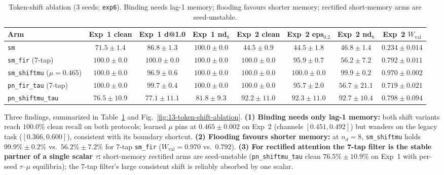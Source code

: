 \documentclass[11pt,a4paper]{article}
\begin{document}
\begin{table}[ht!]
\centering
\caption{Token-shift ablation (3 seeds; \texttt{exp6}). Binding needs lag-1 memory; flooding favours shorter memory; rectified short-memory arms are seed-unstable.}
\label{tab:exp6}
\scriptsize
\setlength{\tabcolsep}{3.0pt}
\begin{tabular}{lccccccc}
\toprule
Arm & Exp~1 clean & Exp~1 d@1.0 & Exp~1 nd$_8$ & Exp~2 clean & Exp~2 eps$_{0.2}$ & Exp~2 nd$_8$ & Exp~2 $W_{\text{val}}$ \\
\midrule
\texttt{sm} & $71.5 \pm 1.4$ & $86.8 \pm 1.3$ & $100.0 \pm 0.0$ & $44.5 \pm 0.9$ & $44.5 \pm 1.8$ & $46.8 \pm 1.4$ & $0.234 \pm 0.014$ \\
\texttt{sm\_fir} (7-tap) & $\mathbf{100.0 \pm 0.0}$ & $\mathbf{100.0 \pm 0.0}$ & $\mathbf{100.0 \pm 0.0}$ & $\mathbf{100.0 \pm 0.0}$ & $95.9 \pm 0.7$ & $56.2 \pm 7.2$ & $0.792 \pm 0.011$ \\
\texttt{sm\_shiftmu} ($\mu{=}0.465$) & $\mathbf{100.0 \pm 0.0}$ & $96.9 \pm 0.6$ & $\mathbf{100.0 \pm 0.0}$ & $\mathbf{100.0 \pm 0.0}$ & $\mathbf{100.0 \pm 0.0}$ & $\mathbf{99.9 \pm 0.2}$ & $\mathbf{0.970 \pm 0.002}$ \\
\texttt{pn\_fir\_tau} (7-tap) & $\mathbf{100.0 \pm 0.0}$ & $99.7 \pm 0.4$ & $\mathbf{100.0 \pm 0.0}$ & $\mathbf{100.0 \pm 0.0}$ & $95.7 \pm 2.0$ & $56.7 \pm 21.1$ & $0.719 \pm 0.021$ \\
\texttt{pn\_shiftmu\_tau} & $76.5 \pm 10.9$ & $77.1 \pm 11.1$ & $81.8 \pm 9.3$ & $92.2 \pm 11.0$ & $92.3 \pm 11.0$ & $92.7 \pm 10.4$ & $0.798 \pm 0.094$ \\
\bottomrule
\end{tabular}
\end{table}

Three findings, summarized in Table~\ref{tab:exp6} and Fig.~\ref{fig:13-token-shift-ablation}. \textbf{(1) Binding needs only lag-1 memory:} both shift variants reach $100.0\%$ clean recall on both protocols; learned $\mu$ pins at $0.465 \pm 0.002$ on Exp~2 (channels $[0.451, 0.492]$) but wanders on the legacy task ($[0.366, 0.600]$), consistent with its boundary shortcut. \textbf{(2) Flooding favours shorter memory:} at $n_d{=}8$, \texttt{sm\_shiftmu} holds $99.9\% \pm 0.2\%$ vs.\ $56.2\% \pm 7.2\%$ for 7-tap \texttt{sm\_fir} ($W_{\text{val}} = 0.970$ vs.\ $0.792$). \textbf{(3) For rectified attention the 7-tap filter is the stable partner of a single scalar $\tau$:} short-memory rectified arms are seed-unstable (\texttt{pn\_shiftmu\_tau} clean $76.5\% \pm 10.9\%$ on Exp~1 with per-seed $\tau$--$\mu$ equilibria); the 7-tap filter's large consistent shift is reliably absorbed by one scalar.
\end{document}
